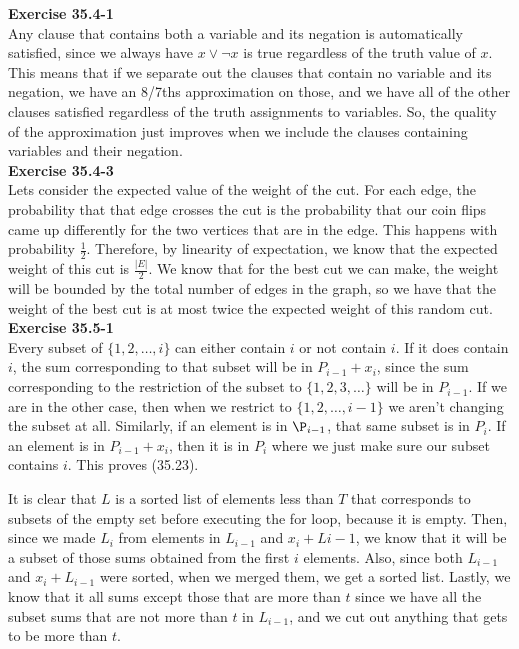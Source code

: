 \documentclass{article}
\begin{document}
\noindent\textbf{Exercise 35.4-1}\\

Any clause that contains both a variable and its negation is automatically satisfied, since we always have $x \vee \neg x$ is true regardless of the truth value of $x$. This means that if we separate out the clauses that contain no variable and its negation, we have an 8/7ths approximation on those, and we have all of the other clauses satisfied regardless of the truth assignments to variables. So, the quality of the approximation just improves when we include the clauses containing variables and their negation.\\



\noindent\textbf{Exercise 35.4-3}\\

Lets consider the expected value of the weight of the cut. For each edge, the probability that that edge crosses the cut is the probability that our coin flips came up differently for the two vertices that are in the edge. This happens with probability $\frac{1}{2}$. Therefore, by linearity of expectation, we know that the expected weight of this cut is $\frac{|E|}{2}$. We know that for the best cut we can make, the weight will be bounded by the total number of edges in the graph, so we have that the weight of the best cut is at most twice the expected weight of this random cut.\\



\noindent\textbf{Exercise 35.5-1}\\

Every subset of $\{1,2,\ldots, i\}$ can either contain $i$ or not contain $i$. If it does contain $i$, the sum corresponding to that subset will be in $P_{i-1} +x_i$, since the sum corresponding to the restriction of the subset to $\{1,2,3,\ldots\}$ will be in $P_{i-1}$. If we are in the other case, then when we restrict to $\{1,2,\ldots, i-1\}$ we aren't changing the subset at all. Similarly, if an element is in $\P_{i-1}$, that same subset is in $P_i$. If an element is in $P_{i-1}+x_i$, then it is in $P_i$ where we just make sure our subset contains $i$. This proves (35.23).

It is clear that $L$ is a sorted list of elements less than $T$ that corresponds to subsets of the empty set before executing the for loop, because it is empty. Then, since we made $L_i$ from elements in $L_{i-1}$ and $x_i + L{i-1}$, we know that it will be a subset of those sums obtained from the first $i$ elements. Also, since both $L_{i-1}$ and $x_i + L_{i-1}$ were sorted, when we merged them, we get a sorted list. Lastly, we know that it all sums except those that are more than $t$ since we have all the subset sums that are not more than $t$ in $L_{i-1}$, and we cut out anything that gets to be more than $t$.\\
\end{document}
